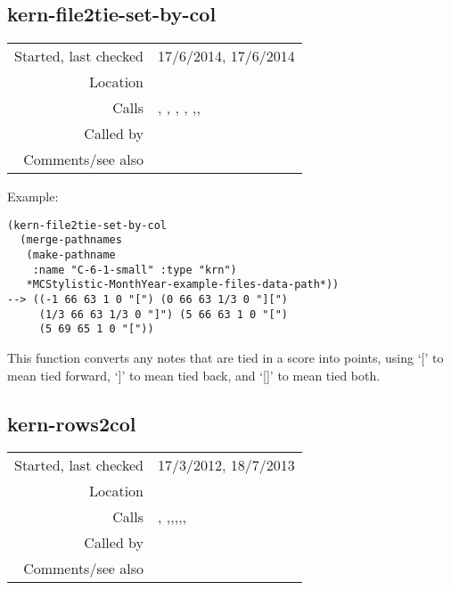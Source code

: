 \subsection*{kern-file2tie-set-by-col}\label{fun:kern-file2tie-set-by-col}

\vspace{0.3cm}
\begin{tabular}{r|p{8cm}}
Started, last checked & 17/6/2014, 17/6/2014 \\
Location & \nameref{sec:kern-by-col} \\
Calls & \nameref{fun:kern-anacrusis-correction}, \nameref{fun:kern-col2dataset-no-tie-resolution}, \newline \nameref{fun:kern-rows2col}, \nameref{fun:read-from-file-arbitrary}, \newline \nameref{fun:sort-dataset-asc},\newline \nameref{fun:staves-info2staves-variable-robust}, \newline \nameref{fun:tab-separated-string2list} \\
Called by & \\
Comments/see also &
\end{tabular}

\vspace{0.5cm}
\noindent Example:
\begin{verbatim}
(kern-file2tie-set-by-col
  (merge-pathnames
   (make-pathname
    :name "C-6-1-small" :type "krn")
   *MCStylistic-MonthYear-example-files-data-path*))
--> ((-1 66 63 1 0 "[") (0 66 63 1/3 0 "][")
     (1/3 66 63 1/3 0 "]") (5 66 63 1 0 "[")
     (5 69 65 1 0 "["))
\end{verbatim}

\noindent This function converts any notes that are
tied in a score into points, using `[' to mean tied
forward, `]' to mean tied back, and `[]' to mean tied
both.


\subsection*{kern-rows2col}\label{fun:kern-rows2col}

\vspace{0.3cm}
\begin{tabular}{r|p{8cm}}
Started, last checked & 17/3/2012, 18/7/2013 \\
Location & \nameref{sec:kern-by-col} \\
Calls & \nameref{fun:fibonacci-list}, \nameref{fun:not-tie-dur-pitch-char-p},\newline \nameref{fun:nth-list-of-lists},\newline \nameref{fun:space-bar-separated-string2list},\newline \nameref{fun:recognised-spine-commandp},\newline \nameref{fun:tab-separated-string2list},\newline \nameref{fun:update-staves-variable} \\
Called by & \nameref{fun:kern-file2dataset-by-col} \\
Comments/see also &
\end{tabular}

